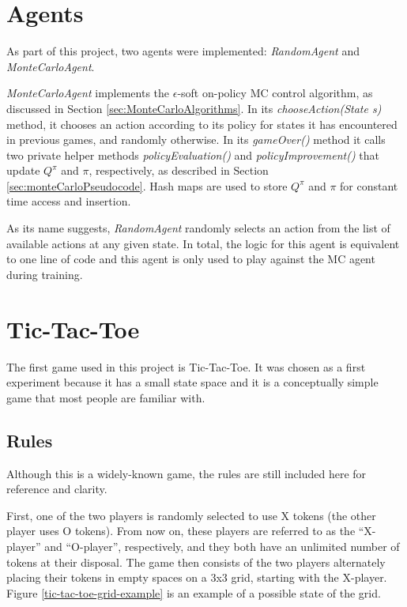 \documentclass[11pt,a4paper]{report}
\begin{document}
\section{Agents}
\label{sec:Agents}

As part of this project, two agents were implemented: \emph{RandomAgent} and \emph{MonteCarloAgent}. 

\emph{MonteCarloAgent} implements the $\epsilon$-soft on-policy MC control algorithm, as discussed in Section \ref{sec:MonteCarloAlgorithms}. In its \emph{chooseAction(State s)} method, it chooses an action according to its policy for states it has encountered in previous games, and randomly otherwise. In its \emph{gameOver()} method it calls two private helper methods \emph{policyEvaluation()} and \emph{policyImprovement()} that update $Q^{\pi}$ and $\pi$, respectively, as described in Section \ref{sec:monteCarloPseudocode}. Hash maps are used to store $Q^{\pi}$ and $\pi$ for constant time access and insertion.

As its name suggests, \emph{RandomAgent} randomly selects an action from the list of available actions at any given state. In total, the logic for this agent is equivalent to one line of code and this agent is only used to play against the MC agent during training.


\section{Tic-Tac-Toe}
\label{sec:TicTacToe}

The first game used in this project is Tic-Tac-Toe. It was chosen as a first experiment because it has a small state space and it is a conceptually simple game that most people are familiar with.


\subsection{Rules}

Although this is a widely-known game, the rules \cite{tic-tac-toe-rules} are still included here for reference and clarity.

First, one of the two players is randomly selected to use X tokens (the other player uses O tokens). From now on, these players are referred to as the ``X-player'' and ``O-player'', respectively, and they both have an unlimited number of tokens at their disposal. The game then consists of the two players alternately placing their tokens in empty spaces on a 3x3 grid, starting with the X-player. Figure \ref{tic-tac-toe-grid-example} is an example of a possible state of the grid.
\end{document}

